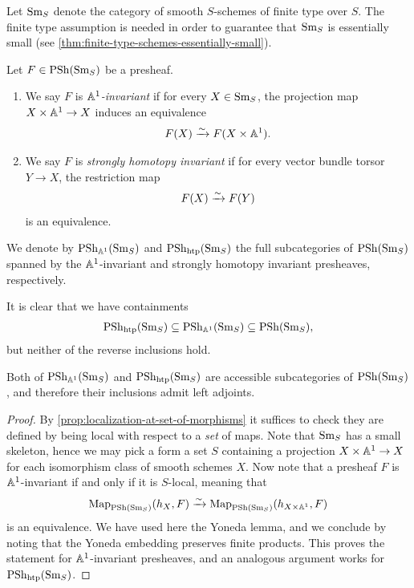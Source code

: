 \documentclass[11pt,openany]{book}
\renewcommand{\Pre}{\mathrm{PSh}}
\begin{document}
\begin{notation} Let $\mathrm{Sm}_S$ denote the category of smooth $S$-schemes of finite type over $S$. The finite type assumption is needed in order to guarantee that $\mathrm{Sm}_S$ is essentially small (see \autoref{thm:finite-type-schemes-essentially-small}).
\end{notation}


\begin{definition} Let $F \in \mathrm{PSh}(\mathrm{Sm}_S)$ be a presheaf.
\begin{enumerate}
    \item We say $F$ is $\mathbb{A}^1$\textit{-invariant} if for every $X \in \mathrm{Sm}_S$, the projection map $X \times \mathbb{A}^1 \to X$ induces an equivalence
    \begin{align*}
        F(X) \xrightarrow{\sim} F(X \times \mathbb{A}^1).
    \end{align*}
    \item We say $F$ is \textit{strongly homotopy invariant} if for every vector bundle torsor $Y \to X$, the restriction map
    \begin{align*}
        F(X) \xrightarrow{\sim} F(Y)
    \end{align*}
    is an equivalence.
\end{enumerate}
We denote by $\Pre_{\A^1}(\Sm_S)$ and $\Pre_{\htp}(\Sm_S)$ the full subcategories of $\Pre(\Sm_S)$ spanned by the $\mathbb{A}^1$-invariant and strongly homotopy invariant presheaves, respectively.
\end{definition}

\begin{remark} It is clear that we have containments
\begin{align*}
    \Pre_{\htp}(\Sm_S) \subseteq \Pre_{\A^1}(\Sm_S) \subseteq \Pre(\Sm_S),
\end{align*}
but neither of the reverse inclusions hold.
\end{remark}

\begin{proposition}\label{prop:shv-and-a1-invariant-presheaves-are-accessible-subcats} 
Both of $\Pre_{\A^1}(\Sm_S)$ and $\Pre_{\htp}(\Sm_S)$ are accessible subcategories of $\Pre(\Sm_S)$, and therefore their inclusions admit left adjoints.
\end{proposition}
\begin{proof} By \autoref{prop:localization-at-set-of-morphisms} it suffices to check they are defined by being local with respect to a \textit{set} of maps. Note that $\mathrm{Sm}_S$ has a small skeleton, hence we may pick a form a set $S$ containing a projection $X \times \mathbb{A}^1 \to X$ for each isomorphism class of smooth schemes $X$. Now note that
a presheaf $F$ is $\mathbb{A}^1$-invariant if and only if it is $S$-local, meaning that
\begin{align*}
    \mathrm{Map}_{\mathrm{PSh}(\mathrm{Sm}_S)}(h_{X},F) \xrightarrow{\sim} \mathrm{Map}_{\mathrm{PSh}(\mathrm{Sm}_S)}(h_{X \times \mathbb{A}^1},F)
\end{align*}
is an equivalence. We have used here the Yoneda lemma, and we conclude by noting that the Yoneda embedding preserves finite products. This proves the statement for $\mathbb{A}^1$-invariant presheaves, and an analogous argument works for $\Pre_{\htp}(\Sm_S)$.
\end{proof}
\end{document}
